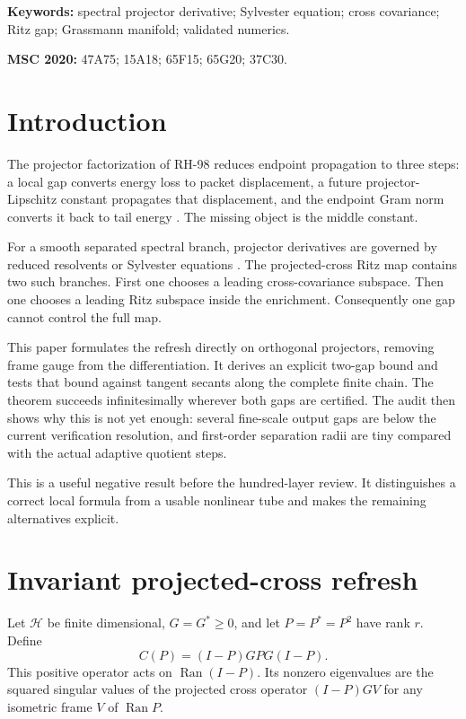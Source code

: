 \documentclass[11pt]{article}
\theoremstyle{definition}
\theoremstyle{remark}
\begin{document}
\noindent\textbf{Keywords:} spectral projector derivative; Sylvester equation;
cross covariance; Ritz gap; Grassmann manifold; validated numerics.

\medskip
\noindent\textbf{MSC 2020:} 47A75; 15A18; 65F15; 65G20; 37C30.

\section{Introduction}

The projector factorization of RH-98 reduces endpoint propagation to three
steps: a local gap converts energy loss to packet displacement, a future
projector-Lipschitz constant propagates that displacement, and the endpoint
Gram norm converts it back to tail energy
\citep{WangProjectorBarrier2026}.  The missing object is the middle constant.

For a smooth separated spectral branch, projector derivatives are governed
by reduced resolvents or Sylvester equations \citep{Kato1995,StewartSun1990}.
The projected-cross Ritz map contains two such branches.  First one chooses a
leading cross-covariance subspace.  Then one chooses a leading Ritz subspace
inside the enrichment.  Consequently one gap cannot control the full map.

This paper formulates the refresh directly on orthogonal projectors, removing
frame gauge from the differentiation.  It derives an explicit two-gap bound
and tests that bound against tangent secants along the complete finite chain.
The theorem succeeds infinitesimally wherever both gaps are certified.  The
audit then shows why this is not yet enough: several fine-scale output gaps
are below the current verification resolution, and first-order separation
radii are tiny compared with the actual adaptive quotient steps.

This is a useful negative result before the hundred-layer review.  It
distinguishes a correct local formula from a usable nonlinear tube and makes
the remaining alternatives explicit.

\section{Invariant projected-cross refresh}
\label{sec:map}

Let $\mathcal H$ be finite dimensional, $G=G^*\ge0$, and let $P=P^*=P^2$ have
rank $r$.  Define
\begin{equation}
 C(P)=(I-P)GPG(I-P).
 \label{eq:covariance}
\end{equation}
This positive operator acts on $\operatorname{Ran}(I-P)$.  Its nonzero
eigenvalues are the squared singular values of the projected cross operator
$(I-P)GV$ for any isometric frame $V$ of $\operatorname{Ran}P$.
\end{document}
